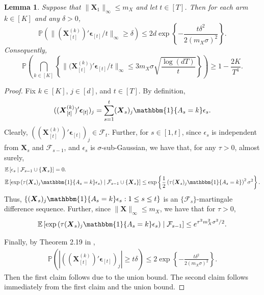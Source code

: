 \documentclass[aos,preprint]{imsart}
\theoremstyle{plain}
\newtheorem{lemma}[theorem]{Lemma}
\theoremstyle{definition}
\newcommand{\bd}[1]{\boldsymbol{#1}}
\newcommand{\idf}{\mathbbm{1}}
\newcommand{\bX}{\boldsymbol{X}}
\newcommand{\bepsilon}{\bd{\epsilon}}
\newcommand{\cF}{\mathcal{F}}
\newcommand{\Exp}{\mathbb{E}}
\newcommand{\Pro}{\mathbb{P}}
\begin{document}
\begin{appendix}
\begin{lemma} \label{lemma:ell_infty bound of x times epsilon}
Suppose that $\|\bX_1\|_{\infty}\le m_X$ and let $t \in [T]$. Then for each arm $k\in[K]$ and any $\delta > 0$,
$$\Pro\left(\|({\bX_{[t]}^{(k)}})' \bepsilon_{[t]}/t\|_{\infty} \ge \delta \right) \le 2d\exp\left\{-\frac{t\delta^2}{2(m_X\sigma)^2} \right\}.$$
Consequently,
\begin{equation*}
    \Pro\left(\bigcap_{k\in [K]}\left\{\|{(\bX_{[t]}^{(k)}})' \bepsilon_{[t]}/t\|_{\infty} 
    \le 3m_X\sigma\sqrt{\frac{\log (dT)}{t}} \right\} \right) \ge 1-\frac{2K}{T^4}.
\end{equation*}
\end{lemma}
\begin{proof}
Fix $k \in [K]$, $j \in [d]$, and $t \in [T]$. By definition,
$$
(({\bX_{[t]}^{(k)}})' \bepsilon_{[t]})_j = \sum_{s=1}^t (\bX_s)_j\idf\{A_s=k\}\epsilon_s.
$$ 
Clearly, $(({\bX_{[t]}^{(k)}})' \bepsilon_{[t]})_j \in \cF_{t}$. Further, for $s \in [1,t]$, since $\epsilon_s$ is independent from $\bX_s$ and $\cF_{s-1}$, and $\epsilon_s$  is $\sigma$-sub-Gaussian, we have that,  for any $\tau > 0$, almost surely, 
\begin{align*}
&
\Exp\left[\epsilon_s \mid \cF_{s-1}\cup\{\bX_s\}\right] = 0. \\
&
\Exp\left[\exp\left(\tau(\bX_s)_j\idf\{A_s=k\}\epsilon_s\right)\mid \cF_{s-1} \cup \{\bX_s\}\right]
\leq 
\exp\left\{\frac{1}{2}\left(\tau(\bX_s)_j\idf\{A_s=k\}\right)^2\sigma^2 \right\}.
\end{align*}
Thus, $\{(\bX_s)_j\idf\{A_s=k\}\epsilon_s: 1\le s\le t\}$ is an $\{\cF_s\}$-martingale difference sequence. Further, since $\|\bX\|_{\infty} \leq m_X$, we have that for $\tau > 0$,
\begin{align*}
    \Exp\left[\exp\left(\tau(\bX_s)_j\idf\{A_s=k\}\epsilon_s\right) \mid \cF_{s-1}\right]  \le e^{\tau^2 m_X^2 \sigma^2/2}.
\end{align*}

Finally, by Theorem 2.19 in \cite{wainwright2019high}, 
\begin{align*}
\Pro\left(|(({\bX_{[t]}^{(k)}})' \bepsilon_{[t]})_j| \ge t\delta\right) \leq 2\exp\left\{-\frac{t\delta^2}{2(m_X\sigma)^2} \right\}.
\end{align*}
Then the first claim follows due to the union bound. The second claim follows immediately from the first claim and the union bound.
\end{proof}


\end{appendix}
\end{document}
